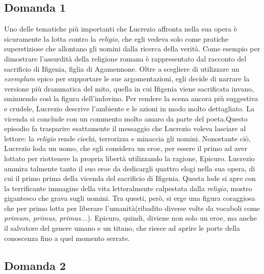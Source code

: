 \documentclass[10pt,a4paper]{article}
\begin{document}
	\subsection{Domanda 1}
	
	Uno delle tematiche più importanti che Lucrezio affronta nella sua opera è sicuramente la lotta contro la \textit{religio}, che egli vedeva solo come pratiche superstiziose che allontano gli uomini dalla ricerca della verità. Come esempio per dimostrare l'assurdità della religione romana è rappresentato dal racconto del sacrificio di Ifigenia, figlia di Agamennone. 
	Oltre a scegliere di utilizzare un \textit{exemplum} epico per supportare le sue argomentazioni, egli decide di narrare la versione più drammatica del mito, quella in cui Ifigenia viene sacrificata invano, sminuendo così la figura dell'indovino. Per rendere la scena ancora più suggestiva e crudele, Lucrezio descrive l'ambiente e le azioni in modo molto dettagliato. La vicenda si conclude con un commento molto amaro da parte del poeta.Questo episodio fa trasparire esattamente il messaggio che Lucrezio voleva lasciare al lettore: la \textit{religio} rende ciechi, terrorizza e minaccia gli uomini. Nonostante ciò, Lucrezio loda un uomo, che egli considera un eroe, per essere il primo ad aver lottato per riottenere la propria libertà utilizzando la ragione, Epicuro. Lucrezio ammira talmente tanto il suo eroe da dedicargli quattro elogi nella sua opera, di cui il primo prima della vicenda del sacrificio di Ifigenia. Questa lode si apre con la terrificante immagine della vita letteralmente calpestata dalla \textit{religio}, mostro gigantesco che grava sugli uomini. Tra questi, però, si erge una figura coraggiosa che per primo lotta per liberare l'umanità(ribadito diverse volte da vocaboli come \textit{primum, primus, primus...}). Epicuro, quindi, diviene non solo un eroe, ma anche il salvatore del genere umano e un titano, che riesce ad aprire le porte della conoscenza fino a quel momento serrate.
	
	\subsection{Domanda 2}
	
	 
	
\end{document}
